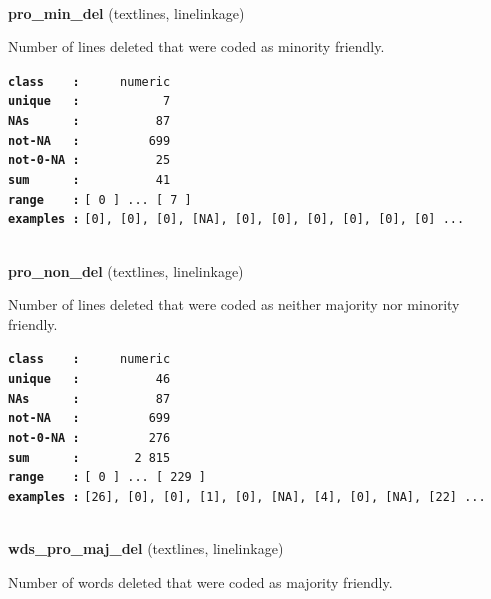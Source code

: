 \documentclass[]{article}
\begin{document}
~

\textbf{pro\_min\_del} (textlines, linelinkage)

Number of lines deleted that were coded as minority friendly.

\textbf{\texttt{class\ \ \ \ :}} \texttt{~~~~~numeric}\\
\textbf{\texttt{unique\ \ \ :}} \texttt{~~~~~~~~~~~7}\\
\textbf{\texttt{NAs\ \ \ \ \ \ :}} \texttt{~~~~~~~~~~87}\\
\textbf{\texttt{not-NA\ \ \ :}} \texttt{~~~~~~~~~699}\\
\textbf{\texttt{not-0-NA\ :}} \texttt{~~~~~~~~~~25}\\
\textbf{\texttt{sum\ \ \ \ \ \ :}} \texttt{~~~~~~~~~~41}\\
\textbf{\texttt{range\ \ \ \ :}}
\texttt{{[}\ 0\ {]}\ ...\ {[}\ 7\ {]}}\\
\textbf{\texttt{examples\ :}}
\texttt{{[}0{]},\ {[}0{]},\ {[}0{]},\ {[}NA{]},\ {[}0{]},\ {[}0{]},\ {[}0{]},\ {[}0{]},\ {[}0{]},\ {[}0{]}\ ...}\\

~

\textbf{pro\_non\_del} (textlines, linelinkage)

Number of lines deleted that were coded as neither majority nor minority
friendly.

\textbf{\texttt{class\ \ \ \ :}} \texttt{~~~~~numeric}\\
\textbf{\texttt{unique\ \ \ :}} \texttt{~~~~~~~~~~46}\\
\textbf{\texttt{NAs\ \ \ \ \ \ :}} \texttt{~~~~~~~~~~87}\\
\textbf{\texttt{not-NA\ \ \ :}} \texttt{~~~~~~~~~699}\\
\textbf{\texttt{not-0-NA\ :}} \texttt{~~~~~~~~~276}\\
\textbf{\texttt{sum\ \ \ \ \ \ :}} \texttt{~~~~~~~2~815}\\
\textbf{\texttt{range\ \ \ \ :}}
\texttt{{[}\ 0\ {]}\ ...\ {[}\ 229\ {]}}\\
\textbf{\texttt{examples\ :}}
\texttt{{[}26{]},\ {[}0{]},\ {[}0{]},\ {[}1{]},\ {[}0{]},\ {[}NA{]},\ {[}4{]},\ {[}0{]},\ {[}NA{]},\ {[}22{]}\ ...}\\

~

\textbf{wds\_pro\_maj\_del} (textlines, linelinkage)

Number of words deleted that were coded as majority friendly.
\end{document}
